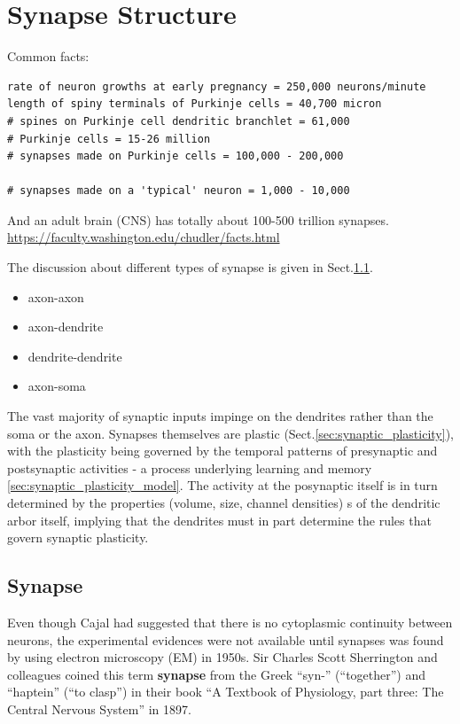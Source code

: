 \chapter{Synapse Structure}

Common facts:
\label{sec:synapse-number-per-neuron}
\begin{verbatim}
rate of neuron growths at early pregnancy = 250,000 neurons/minute
length of spiny terminals of Purkinje cells = 40,700 micron
# spines on Purkinje cell dendritic branchlet = 61,000
# Purkinje cells = 15-26 million
# synapses made on Purkinje cells = 100,000 - 200,000

# synapses made on a 'typical' neuron = 1,000 - 10,000

\end{verbatim}
And an adult brain (CNS) has totally about 100-500 trillion synapses. 
\url{https://faculty.washington.edu/chudler/facts.html}

The discussion about different types of synapse is given in
Sect.\ref{sec:synapse}.
\begin{itemize}
  \item axon-axon
  \item axon-dendrite
  \item dendrite-dendrite
  \item axon-soma
\end{itemize}

The vast majority of synaptic inputs impinge on the dendrites rather than the
soma or the axon.
Synapses themselves are plastic (Sect.\ref{sec:synaptic_plasticity}), with the
plasticity being governed by the temporal patterns of presynaptic and
postsynaptic activities - a process underlying learning and memory
\ref{sec:synaptic_plasticity_model}.
The activity at the posynaptic itself is in turn determined by the properties
(volume, size, channel densities) s of the dendritic arbor itself, implying that
the dendrites must in part determine the rules that govern synaptic plasticity.

\section{Synapse}
\label{sec:synapse}

Even though Cajal had suggested that there is no cytoplasmic continuity between
neurons, the experimental evidences were not available until synapses was found
by using electron microscopy (EM) in 1950s. Sir Charles Scott Sherrington and
colleagues coined this term {\bf synapse} from the Greek ``syn-'' (``together'')
and ``haptein'' (``to clasp'') in their book ``A Textbook of Physiology, part three:
The Central Nervous System'' in 1897.

